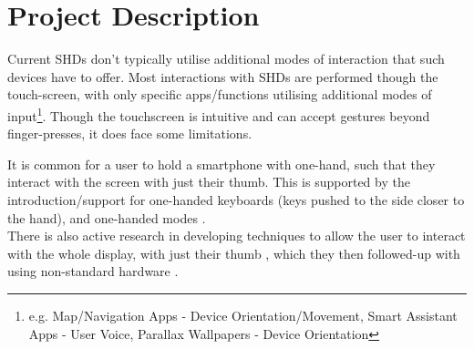 \section{Project Description}




Current SHDs don't typically utilise additional modes of interaction that such devices have to offer. Most interactions with SHDs are performed though the touch-screen, with only specific apps/functions utilising additional modes of input\footnote{
    e.g. Map/Navigation Apps - Device Orientation/Movement, 
    Smart Assistant Apps - User Voice,
    Parallax Wallpapers - Device Orientation
}.
Though the touchscreen is intuitive and can accept gestures beyond finger-presses, it does face some limitations.

It is common for a user to hold a smartphone with one-hand, such that they interact with the screen with just their thumb. This is supported by the introduction/support for one-handed keyboards (keys pushed to the side closer to the hand), and one-handed modes \citep{samsung2021onehand}.\\
There is also active research in developing techniques to allow the user to interact with the whole display, with just their thumb \citep{hakka2020design}, which they then followed-up with using non-standard hardware \citep{ikeda2021hover}.


